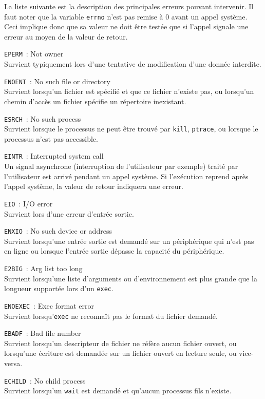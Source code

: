 \documentclass [twoside] {report}
\begin{document}
La liste suivante est la description
des principales erreurs pouvant intervenir. Il faut noter que
la variable \texttt {errno} n'est pas remise à 0 avant un
appel système. Ceci implique donc que sa valeur ne
doit être testée que si l'appel signale une
erreur au moyen de la valeur de retour.

\texttt {EPERM}~: Not owner \\
Survient typiquement lors d'une
tentative de modification d'une donnée interdite.

\texttt {ENOENT}~: No such file or directory \\
Survient lorsqu'un fichier est spécifié et que ce
fichier n'existe pas, ou lorsqu'un chemin d'accès
un fichier spécifie un répertoire inexistant.

\texttt {ESRCH}~: No such process \\
Survient lorsque le processus ne peut être trouvé
par \texttt {kill}, \texttt {ptrace}, ou lorsque le processus
n'est pas accessible.

\texttt {EINTR}~: Interrupted system call \\
Un signal asynchrone (interruption de
l'utilisateur par exemple) traité par
l'utilisateur est arrivé pendant un appel système.
Si l'exécution reprend après l'appel système, la
valeur de retour indiquera une erreur.

\texttt {EIO}~: I/O error \\
Survient lors d'une erreur d'entrée sortie.

\texttt {ENXIO}~: No such device or address \\
Survient lorsqu'une entrée sortie est demandé sur
un périphérique qui n'est pas en ligne ou lorsque
l'entrée sortie dépasse la capacité du
périphérique.

\texttt {E2BIG}~: Arg list too long \\
Survient lorsqu'une liste d'arguments ou
d'environnement est plus grande que la longueur
supportée lors d'un \texttt {exec}.

\texttt {ENOEXEC}~: Exec format error \\
Survient lorsqu'\texttt {exec} ne reconnaît pas le
format du fichier demandé.

\texttt {EBADF}~: Bad file number \\
Survient lorsqu'un descripteur de fichier ne
réfère aucun fichier ouvert, ou lorsqu'une
écriture est demandée sur un fichier ouvert en
lecture seule, ou vice-versa.

\texttt {ECHILD}~: No child process \\
Survient lorsqu'un \texttt {wait} est demandé et
qu'aucun processus fils n'existe.
\end{document}
